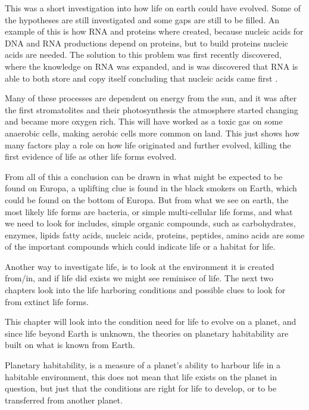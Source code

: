 This was a short investigation into how life on earth could have evolved. Some of the hypotheses are still investigated and some gaps are still to be filled. An example of this is how RNA and proteins where created, because nucleic acids for DNA and RNA productions depend on proteins, but to build proteins nucleic acids are needed. The solution to this problem was first recently discovered, where the knowledge on RNA was expanded, and is was discovered that RNA is able to both store and copy itself concluding that nucleic acids came first \cite{UndestandingEvolution}.

Many of these processes are dependent on energy from the sun, and it was after the first stromatolites and their photosynthesis the atmosphere started changing and became more oxygen rich. This will have worked as a toxic gas on some anaerobic cells, making aerobic cells more common on land. This just shows how many factors play a role on how life originated and further evolved, killing the first evidence of life as other life forms evolved.

From all of this a conclusion can be drawn in what might be expected to be found on Europa, a uplifting clue is found in the black smokers on Earth, which could be found on the bottom of Europa. But from what we see on earth, the most likely life forms are bacteria, or simple multi-cellular life forms, and what we need to look for includes, simple organic compounds, such as carbohydrates, enzymes, lipids fatty acids, nucleic acids, proteins, peptides, amino acids are some of the important compounds which could indicate life or a habitat for life.

Another way to investigate life, is to look at the environment it is created from/in, and if life did exists we might see reminisce of life. The next two chapters look into the life harboring conditions and possible clues to look for from extinct life forms.


This chapter will look into the condition need for life to evolve on a planet, and since life beyond Earth is unknown, the theories on planetary habitability are built on what is known from Earth.

Planetary habitability, is a measure of a planet's ability to harbour life in a habitable environment\cite{PlanetaryHabitability}, this does not mean that life exists on the planet in question, but just that the conditions are right for life to develop, or to be transferred from another planet.

